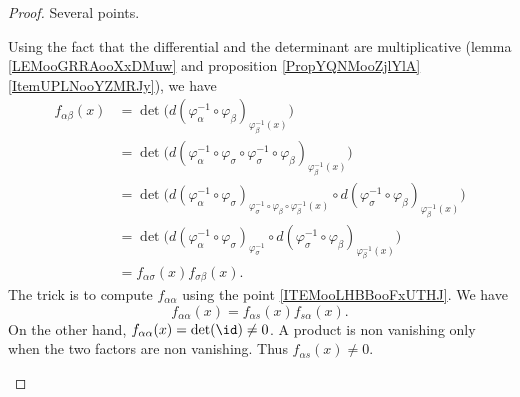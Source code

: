 \begin{proof}
	Several points.
	\begin{subproof}

		Using the fact that the differential and the determinant are multiplicative (lemma \ref{LEMooGRRAooXxDMuw} and proposition \ref{PropYQNMooZjlYlA}\ref{ItemUPLNooYZMRJy}), we have
		\begin{subequations}
			\begin{align}
				f_{\alpha\beta}(x) & =\det\Big( d(\varphi_{\alpha}^{-1}\circ \varphi_{\beta})_{\varphi_{\beta}^{-1}(x)} \Big)                                                                                                                                           \\
				                   & =\det\Big(  d(\varphi_{\alpha}^{-1}\circ  \varphi_{\sigma}\circ\varphi_{\sigma}^{-1}\circ  \varphi_{\beta})_{\varphi_{\beta}^{-1}(x)}  \Big)                                                                                       \\
				                   & =\det\Big(  d(\varphi_{\alpha}^{-1}\circ  \varphi_{\sigma})_{      \varphi_{\sigma}^{-1}\circ\varphi_{\beta}\circ\varphi_{\beta}^{-1}(x)    }\circ d(\varphi_{\sigma}^{-1}\circ  \varphi_{\beta})_{\varphi_{\beta}^{-1}(x)}  \Big) \\
				                   & =\det\Big(  d(\varphi_{\alpha}^{-1}\circ  \varphi_{\sigma})_{      \varphi_{\sigma}^{-1}   }\circ d(\varphi_{\sigma}^{-1}\circ  \varphi_{\beta})_{\varphi_{\beta}^{-1}(x)}  \Big)                                                  \\
				                   & = f_{\alpha\sigma}(x)f_{\sigma\beta}(x).
			\end{align}
		\end{subequations}
		The trick is to compute \( f_{\alpha\alpha}\) using the point \ref{ITEMooLHBBooFxUTHJ}. We have
		\begin{equation}
			f_{\alpha\alpha}(x)=f_{\alpha s}(x)f_{s\alpha}(x).
		\end{equation}
		On the other hand, \( f_{\alpha\alpha}(x)=\det(\id)\neq 0\). A product is non vanishing only when the two factors are non vanishing. Thus \( f_{\alpha s}(x)\neq 0\).
	\end{subproof}
\end{proof}

